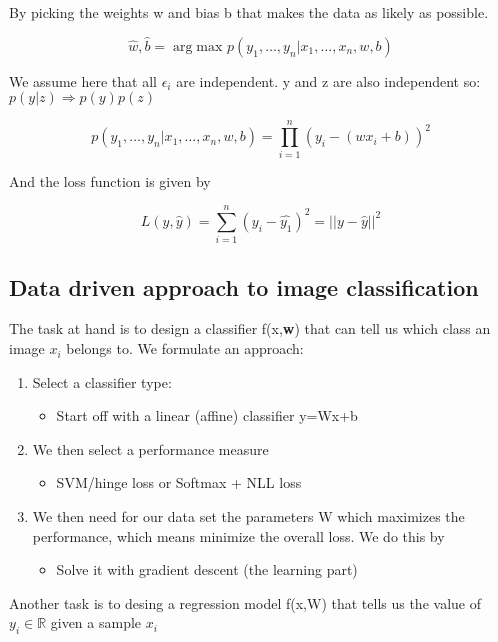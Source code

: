 By picking the weights w and bias b that makes the data as likely as possible. 

	\begin{equation}
		\hat{w},\hat{b} = \arg \text{max } p(y_1,\ldots,y_n|x_1,\ldots,x_n, w, b)
	\end{equation}

We assume here that all $\epsilon_i$ are independent. y and z are also independent so: $p(y|z) \Rightarrow p(y)p(z)$

	\begin{equation}
		p(y_1,\ldots,y_n| x_1,\ldots,x_n, w,b) = \prod_{i =1}^{n} (y_i - (wx_i +b))^{2} 
	\end{equation}

And the loss function is given by

	\begin{equation}
		L(y,\hat{y}) = \sum_{i=1}^{n} (y_i-\hat{y_1})^{2} = ||y-\hat{y}||^{2}
	\end{equation}

\subsection*{Data driven approach to image classification}
The task at hand is to design a classifier f(x,\textbf{w}) that can tell us which class an image $x_i$ belongs to. We formulate an approach:

\begin{enumerate}
	\item Select a classifier type:
		\begin{itemize}
			\item Start off with a linear (affine) classifier y=Wx+b
		\end{itemize}
	\item We then select a performance measure
		 \begin{itemize}
		 	\item SVM/hinge loss or Softmax + NLL loss
		 \end{itemize}
	\item We then need for our data set the parameters W which maximizes the performance, which means minimize the overall loss. We do this by
	\begin{itemize}
		\item Solve it with gradient descent (the learning part)
	\end{itemize}
\end{enumerate}

Another task is to desing a regression model f(x,W) that tells us the value of $y_i \in \mathbb{R}$ given a sample $x_i$


